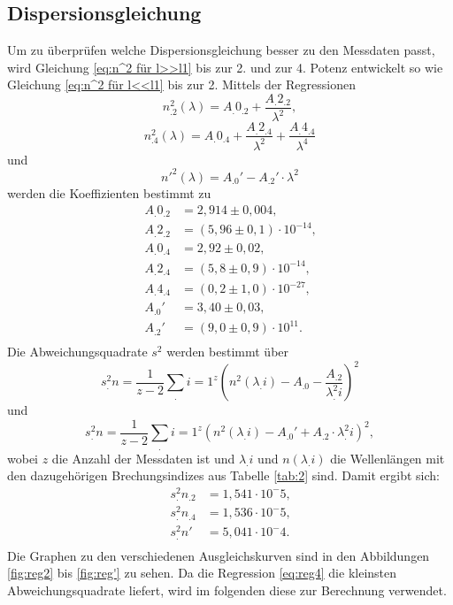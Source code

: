 \subsection{Dispersionsgleichung}
\label{sec:Dispersion}
Um zu überprüfen welche Dispersionsgleichung besser zu den Messdaten passt, wird Gleichung \eqref{eq:n^2 für l>>l1} bis zur 2. und zur 4. Potenz entwickelt so wie Gleichung \eqref{eq:n^2 für l<<l1} bis zur 2. 
Mittels der Regressionen
\begin{equation}
n^2_.2 (\lambda)=A_.{0_.2}+\frac{A_.{2_.2}}{\lambda^2},\label{eq:reg2}
\end{equation}
\begin{equation}
n^2_.4 (\lambda)=A_.{0_.4}+\frac{A_.{2_.4}}{\lambda^2}+\frac{A_.{4_.4}}{\lambda^4}\label{eq:reg4}
\end{equation}
und
\begin{equation}
n'^2(\lambda)=A_.0'-A_.2'\cdot \lambda^2\label{eq:reg'}
\end{equation}
werden die Koeffizienten bestimmt zu
\begin{align*}
A_.{0_.2}&= 2,914\pm 0,004\text{,} \\
A_.{2_.2}&= (5,96\pm 0,1)\cdot 10^{-14}\text{,} \\
A_.{0_.4}&= 2,92\pm 0,02 \text{,}\\
A_.{2_.4}&= (5,8\pm 0,9)\cdot 10^{-14}\text{,} \\
A_.{4_.4}&= (0,2\pm 1,0)\cdot 10^{-27}\text{,} \\
A_.0'  &= 3,40\pm 0,03\text{,} \\
A_.2'  &= (9,0\pm 0,9)\cdot 10^{11}\text{.} \\
\end{align*}
Die Abweichungsquadrate $s^2$ werden bestimmt über 
\begin{equation}
s^2_.n = \frac{1}{z-2}\sum_.{i=1}^z \left(n^2(\lambda_.i)-A_.0-\frac{A_.2}{\lambda^2_.i}\right)^2
\end{equation}
und
\begin{equation}
s^2_.n = \frac{1}{z-2}\sum_.{i=1}^z \left(n^2(\lambda_.i)-A_.0' +A_.2\cdot\lambda^2_.i\right)^2,
\end{equation}
wobei $z$ die Anzahl der Messdaten ist und $\lambda_.i$ und $n(\lambda_.i)$ die Wellenlängen mit den dazugehörigen Brechungsindizes aus Tabelle \ref{tab:2} sind.
Damit ergibt sich:
\begin{align*}
s^2_.{n_.2}&=1,541\cdot 10^-5\text{,} \\
s^2_.{n_.4}&=1,536\cdot 10^-5\text{,} \\
s^2_.{n'}&=5,041\cdot 10^-4\text{.} \\
\end{align*}
Die Graphen zu den verschiedenen Ausgleichskurven sind in den Abbildungen \ref{fig:reg2} bis \ref{fig:reg'} zu sehen.
Da die Regression \eqref{eq:reg4} die kleinsten Abweichungsquadrate liefert, wird im folgenden diese zur Berechnung verwendet.

